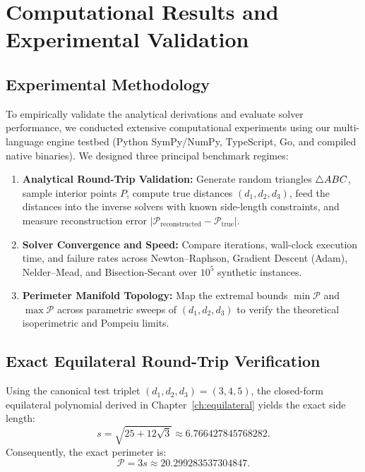 \chapter{Computational Results and Experimental Validation}
\label{ch:computational-results}

\section{Experimental Methodology}
To empirically validate the analytical derivations and evaluate solver performance, we conducted extensive computational experiments using our multi-language engine testbed (Python SymPy/NumPy, TypeScript, Go, and compiled native binaries). We designed three principal benchmark regimes:
\begin{enumerate}
    \item \textbf{Analytical Round-Trip Validation:} Generate random triangles $\triangle ABC$, sample interior points $P$, compute true distances $(d_1, d_2, d_3)$, feed the distances into the inverse solvers with known side-length constraints, and measure reconstruction error $| \mathcal{P}_{\text{reconstructed}} - \mathcal{P}_{\text{true}} |$.
    \item \textbf{Solver Convergence and Speed:} Compare iterations, wall-clock execution time, and failure rates across Newton--Raphson, Gradient Descent (Adam), Nelder--Mead, and Bisection-Secant over $10^5$ synthetic instances.
    \item \textbf{Perimeter Manifold Topology:} Map the extremal bounds $\min \mathcal{P}$ and $\max \mathcal{P}$ across parametric sweeps of $(d_1, d_2, d_3)$ to verify the theoretical isoperimetric and Pompeiu limits.
\end{enumerate}

\section{Exact Equilateral Round-Trip Verification}
Using the canonical test triplet $(d_1, d_2, d_3) = (3, 4, 5)$, the closed-form equilateral polynomial derived in Chapter~\ref{ch:equilateral} yields the exact side length:
\begin{equation}
s = \sqrt{25 + 12\sqrt{3}} \approx 6.766427845768282.
\end{equation}
Consequently, the exact perimeter is:
\begin{equation}
\mathcal{P} = 3s \approx 20.299283537304847.
\end{equation}

